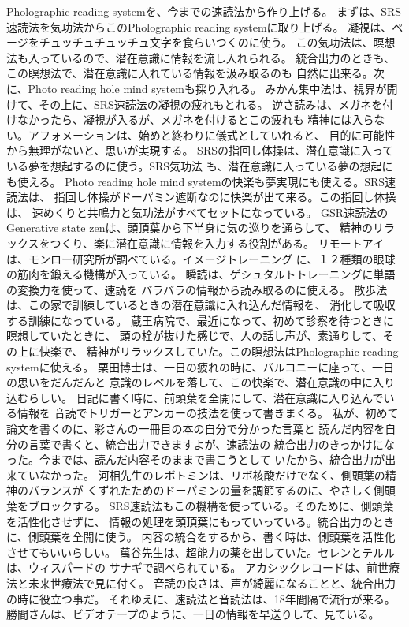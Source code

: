 \documentclass{jsarticle}
\begin{document}
\title{}
\author{}
\date{}
\maketitle

  Pholographic reading systemを、今までの速読法から作り上げる。
まずは、SRS速読法を気功法からこのPholographic reading systemに取り上げる。
凝視は、ページをチュッチュチュッチュ文字を食らいつくのに使う。
この気功法は、瞑想法も入っているので、潜在意識に情報を流し入れられる。
統合出力のときも、この瞑想法で、潜在意識に入れている情報を汲み取るのも
自然に出来る。次に、Photo reading hole mind systemも採り入れる。
みかん集中法は、視界が開けて、その上に、SRS速読法の凝視の疲れもとれる。
逆さ読みは、メガネを付けなかったら、凝視が入るが、メガネを付けるとこの疲れも
精神には入らない。アフォメーションは、始めと終わりに儀式としていれると、
目的に可能性から無理がないと、思いが実現する。
SRSの指回し体操は、潜在意識に入っている夢を想起するのに使う。SRS気功法
も、潜在意識に入っている夢の想起にも使える。
Photo reading hole mind systemの快楽も夢実現にも使える。SRS速読法は、
指回し体操がドーパミン遮断なのに快楽が出て来る。この指回し体操は、
速めくりと共鳴力と気功法がすべてセットになっている。
GSR速読法のGenerative state zenは、頭頂葉から下半身に気の巡りを通らして、
精神のリラックスをつくり、楽に潜在意識に情報を入力する役割がある。
リモートアイは、モンロー研究所が調べている。イメージトレーニング
に、１２種類の眼球の筋肉を鍛える機構が入っている。
瞬読は、ゲシュタルトトレーニングに単語の変換力を使って、速読を
バラバラの情報から読み取るのに使える。
散歩法は、この家で訓練しているときの潜在意識に入れ込んだ情報を、
消化して吸収する訓練になっている。
蔵王病院で、最近になって、初めて診察を待つときに瞑想していたときに、
頭の栓が抜けた感じで、人の話し声が、素通りして、その上に快楽で、
精神がリラックスしていた。この瞑想法はPholographic reading systemに使える。
栗田博士は、一日の疲れの時に、バルコニーに座って、一日の思いをだんだんと
意識のレベルを落して、この快楽で、潜在意識の中に入り込むらしい。
日記に書く時に、前頭葉を全開にして、潜在意識に入り込んでいる情報を
音読でトリガーとアンカーの技法を使って書きまくる。
私が、初めて論文を書くのに、彩さんの一冊目の本の自分で分かった言葉と
読んだ内容を自分の言葉で書くと、統合出力できますよが、速読法の
統合出力のきっかけになった。今までは、読んだ内容そのままで書こうとして
いたから、統合出力が出来ていなかった。
河相先生のレボトミンは、リボ核酸だけでなく、側頭葉の精神のバランスが
くずれたためのドーパミンの量を調節するのに、やさしく側頭葉をブロックする。
SRS速読法もこの機構を使っている。そのために、側頭葉を活性化させずに、
情報の処理を頭頂葉にもっていっている。統合出力のときに、側頭葉を全開に使う。
内容の統合をするから、書く時は、側頭葉を活性化させてもいいらしい。
萬谷先生は、超能力の薬を出していた。セレンとテルルは、ウィスパードの
サナギで調べられている。
アカシックレコードは、前世療法と未来世療法で見に付く。
音読の良さは、声が綺麗になることと、統合出力の時に役立つ事だ。
それゆえに、速読法と音読法は、18年間隔で流行が来る。
勝間さんは、ビデオテープのように、一日の情報を早送りして、見ている。
\end{document}
